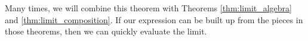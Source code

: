 Many times, we will combine this theorem with Theorems \ref{thm:limit_algebra} and \ref{thm:limit_composition}.  If our expression can be built up from the pieces in those theorems, then we can quickly evaluate the limit.

